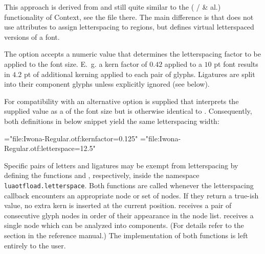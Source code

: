 \begin{description}
       This approach is derived from and still quite similar to the
        ( /
        \& al.) functionality of
       Context, see the file  there.
       The main difference is that  does not
       use \LUATEX attributes to assign letterspacing to regions,
       but defines virtual letterspaced versions of a font.

       The option  accepts a numeric value that
       determines the letterspacing factor to be applied to the font
       size.
       E.~g. a kern factor of $0.42$ applied to a $10$ pt font
       results in $4.2$ pt of additional kerning applied to each
       pair of glyphs.
       Ligatures are split into their component glyphs unless
       explicitly ignored (see below).

       For compatibility with \XETEX an alternative
        option is supplied that interprets the
       supplied value as a  of the font size but
       is otherwise identical to .
       Consequently, both definitions in below snippet yield the same
       letterspacing width:

       \beginlisting
 \font\iwonakernedA="file:Iwona-Regular.otf:kernfactor=0.125"
 \font\iwonakernedB="file:Iwona-Regular.otf:letterspace=12.5"
       \endlisting

       Specific pairs of letters and ligatures may be exempt from
       letterspacing by defining the \LUA functions
        and ,
       respectively, inside the namespace \verb|luaotfload.letterspace|.
       Both functions are called whenever the letterspacing callback
       encounters an appropriate node or set of nodes.
       If they return a true-ish value, no extra kern is inserted at
       the current position.
        receives a pair of consecutive
       glyph nodes in order of their appearance in the node list.
        receives a single node which can be
       analyzed into components.
       (For details refer to the  section in the
       \LUATEX reference manual.)
       The implementation of both functions is left entirely to the
       user.



\end{description}
